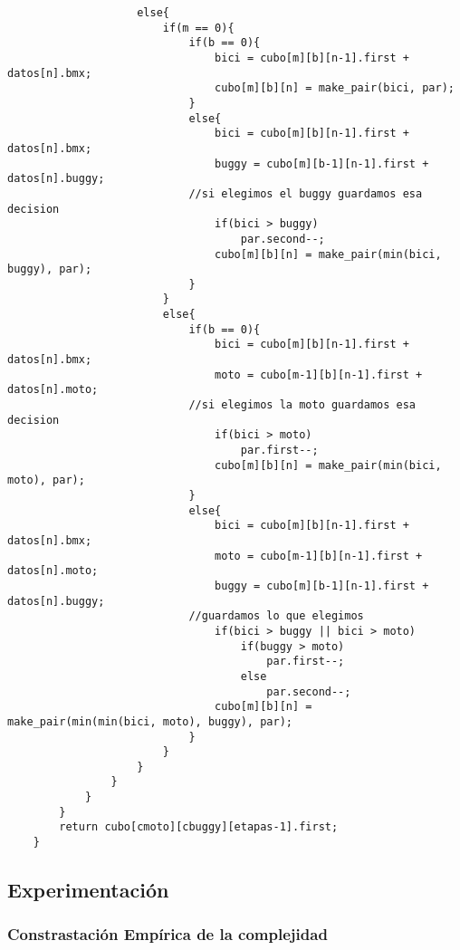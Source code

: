 	\begin{codesnippet}
	\begin{verbatim}
                    else{
                        if(m == 0){
                            if(b == 0){
                                bici = cubo[m][b][n-1].first + datos[n].bmx;
                                cubo[m][b][n] = make_pair(bici, par);
                            }
                            else{
                                bici = cubo[m][b][n-1].first + datos[n].bmx;
                                buggy = cubo[m][b-1][n-1].first + datos[n].buggy;
                            //si elegimos el buggy guardamos esa decision
                                if(bici > buggy)
                                    par.second--;
                                cubo[m][b][n] = make_pair(min(bici, buggy), par);
                            }
                        }
                        else{
                            if(b == 0){
                                bici = cubo[m][b][n-1].first + datos[n].bmx;
                                moto = cubo[m-1][b][n-1].first + datos[n].moto;
                            //si elegimos la moto guardamos esa decision
                                if(bici > moto)
                                    par.first--;
                                cubo[m][b][n] = make_pair(min(bici, moto), par);
                            }
                            else{
                                bici = cubo[m][b][n-1].first + datos[n].bmx;
                                moto = cubo[m-1][b][n-1].first + datos[n].moto;
                                buggy = cubo[m][b-1][n-1].first + datos[n].buggy;
                            //guardamos lo que elegimos
                                if(bici > buggy || bici > moto)
                                    if(buggy > moto)
                                        par.first--;
                                    else
                                        par.second--;
                                cubo[m][b][n] = make_pair(min(min(bici, moto), buggy), par);
                            }
                        }
                    }
                }
            }
        }
        return cubo[cmoto][cbuggy][etapas-1].first;
    }
	\end{verbatim}
	\end{codesnippet}


\newpage
\subsection{Experimentaci\'on}

\subsubsection{Constrastaci\'on Emp\'irica de la complejidad}
